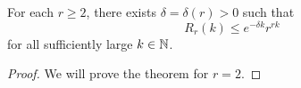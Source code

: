 
  \begin{theorem}[Balister et al. 2024]
    \label{thm:Ramsey-multicolour}
    For each $r \ge 2$, there exists $\delta = \delta(r) > 0$ such that
    \begin{equation*}
      R_r(k) \le e^{-\delta k} r^{rk}
    \end{equation*}
    for all sufficiently large $k \in \mathbb{N}$.
  \end{theorem}

  \begin{proof}
    We will prove the theorem for $r = 2$.
  \end{proof}
